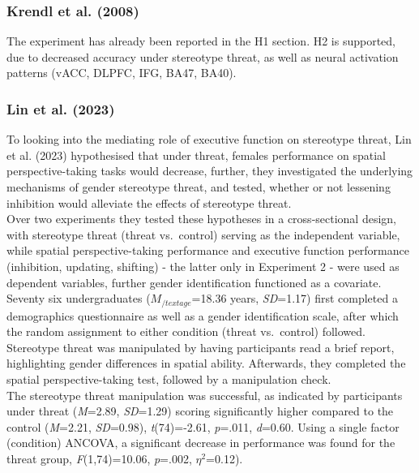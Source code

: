 \documentclass[
  stu,floatsintext]{apa7}
\begin{document}
\subsubsection{Krendl et al. (2008)}\label{krendlnegativeconsequencesthreat2008-1}

The experiment has already been reported in the H1 section.
H2 is supported, due to decreased accuracy under stereotype threat, as well as neural activation patterns (vACC, DLPFC, IFG, BA47, BA40).

\subsubsection{Lin et al. (2023)}\label{lineffectstereotypethreat2023}

To looking into the mediating role of executive function on stereotype threat, Lin et al. (2023) hypothesised that under threat, females performance on spatial perspective-taking tasks would decrease, further, they investigated the underlying mechanisms of gender stereotype threat, and tested, whether or not lessening inhibition would alleviate the effects of stereotype threat.\\
Over two experiments they tested these hypotheses in a cross-sectional design, with stereotype threat (threat vs.~control) serving as the independent variable, while spatial perspective-taking performance and executive function performance (inhibition, updating, shifting) - the latter only in Experiment 2 - were used as dependent variables, further gender identification functioned as a covariate.
Seventy six undergraduates (\(M_{/text{age}}\)=18.36 years, \emph{SD}=1.17) first completed a demographics questionnaire as well as a gender identification scale, after which the random assignment to either condition (threat vs.~control) followed.
Stereotype threat was manipulated by having participants read a brief report, highlighting gender differences in spatial ability.
Afterwards, they completed the spatial perspective-taking test, followed by a manipulation check.\\
The stereotype threat manipulation was successful, as indicated by participants under threat (\emph{M}=2.89, \emph{SD}=1.29) scoring significantly higher compared to the control (\emph{M}=2.21, \emph{SD}=0.98), \emph{t}(74)=-2.61, \emph{p}=.011, \emph{d}=0.60.
Using a single factor (condition) ANCOVA, a significant decrease in performance was found for the threat group, \emph{F}(1,74)=10.06, \emph{p}=.002, \(\eta^{2}\)=0.12).\\
\end{document}

